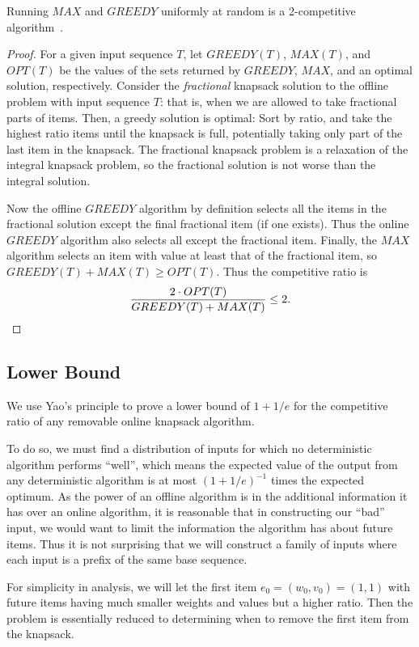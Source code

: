 \begin{theorem}
	Running $MAX$ and $GREEDY$ uniformly at random is a 2-competitive algorithm~\cite{han}.
\end{theorem}
\begin{proof}
	For a given input sequence $T$, let $GREEDY(T)$, $MAX(T)$, and $OPT(T)$ be the values of the sets returned by $GREEDY$, $MAX$, and an optimal solution, respectively. Consider the \emph{fractional} knapsack solution to the offline problem with input sequence $T$: that is, when we are allowed to take fractional parts of items. Then, a greedy solution is optimal: Sort by ratio, and take the highest ratio items until the knapsack is full, potentially taking only part of the last item in the knapsack. The fractional knapsack problem is a relaxation of the integral knapsack problem, so the fractional solution is not worse than the integral solution.
	
	Now the offline $GREEDY$ algorithm by definition selects all the items in the fractional solution except the final fractional item (if one exists). Thus the online $GREEDY$ algorithm also selects all except the fractional item. Finally, the $MAX$ algorithm selects an item with value at least that of the fractional item, so $GREEDY(T)+MAX(T) \ge OPT(T)$. Thus the competitive ratio is
\begin{equation*}
\frac{2\cdot OPT(T)}{GREEDY(T)+MAX(T)} \le 2.\qedhere
\end{equation*}
\end{proof}

\subsection{Lower Bound}
We use Yao's principle to prove a lower bound of $1+1/e$ for the competitive ratio of any removable online knapsack algorithm.

To do so, we must find a distribution of inputs for which no deterministic algorithm performs ``well'', which means the expected value of the output from any deterministic algorithm is at most $(1+1/e)^{-1}$ times the expected optimum. As the power of an offline algorithm is in the additional information it has over an online algorithm, it is reasonable that in constructing our ``bad'' input, we would want to limit the information the algorithm has about future items. Thus it is not surprising that we will construct a family of inputs where each input is a prefix of the same base sequence.

For simplicity in analysis, we will let the first item $e_0=(w_0,v_0)=(1,1)$ with future items having much smaller weights and values but a higher ratio. Then the problem is essentially reduced to determining when to remove the first item from the knapsack.


